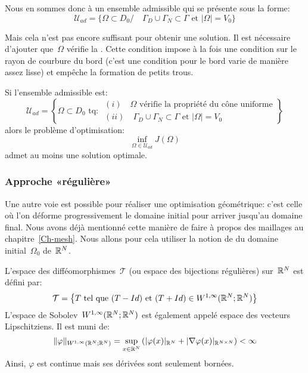 Nous en sommes donc à un ensemble admissible qui se présente sous la forme:
\begin{equation}
\mathcal{U}_{ad}=\{ \Omega\subset D_0 /\quad 
\Gamma_D \cup \Gamma_N \subset \Gamma \text{ et } |\Omega|=V_0 \}
\end{equation}

Mais cela n'est pas encore suffisant pour obtenir une solution.
Il est nécessaire d'ajouter que~$\Omega$ vérifie la . Cette condition impose à la fois une condition sur le rayon de courbure du bord (c'est une condition pour le bord varie de manière assez lisse) et empêche la formation de petits trous.

\begin{theoreme}[D. Chenais]
Si l'ensemble admissible est:
\begin{equation}
\mathcal{U}_{ad}=\left\{ \Omega\subset D_0 \text{ tq: }
\begin{array}{l}
(i)\quad \Omega \text{ vérifie la propriété du cône uniforme}\\
(ii)\quad \Gamma_D \cup \Gamma_N \subset \Gamma \text{ et } |\Omega|=V_0 
\end{array}
\right\}
\end{equation}
alors le problème d'optimisation:
\[ \inf_{\Omega\in\mathcal{U}_{ad}} J(\Omega) \]
admet au moins une solution optimale.
\end{theoreme}

\medskip
\subsubsection{Approche «régulière»}

Une autre voie est possible pour réaliser une optimisation géométrique: c'est celle où l'on déforme progressivement le domaine initial pour arriver jusqu'au domaine final. Nous avons déjà mentionné cette manière de faire à propos des maillages au chapitre~\ref{Ch-mesh}. Nous allons pour cela utiliser la notion de  du domaine initial~$\Omega_0$ de~$\mathbb R^N$.

\medskip
\begin{definition}
L'espace des difféomorphismes~$\mathcal{T}$ (ou espace des bijections régulières) sur~$\mathbb R^N$ est défini par:
\begin{equation}
\mathcal{T}=\left\{ T \text{ tel que } (T-Id) \text{ et } (T+Id)\in W^{1,\infty}(\mathbb R^N;\mathbb R^N)\right\}
\end{equation}
L'espace de Sobolev~$W^{1,\infty}(\mathbb R^N;\mathbb R^N)$ est également appelé espace des vecteurs Lipschitziens. Il est muni de:
\begin{equation}
\|\varphi\|_{W^{1,\infty}(\mathbb R^N;\mathbb R^N)}=\sup_{x\in\mathbb R^N} \left(|\varphi(x)|_{\mathbb R^N}
+|\nabla\varphi(x)|_{\mathbb R^{N\times N}}\right) <\infty
\end{equation}
Ainsi, $\varphi$ est continue mais ses dérivées sont seulement bornées.
\end{definition}

